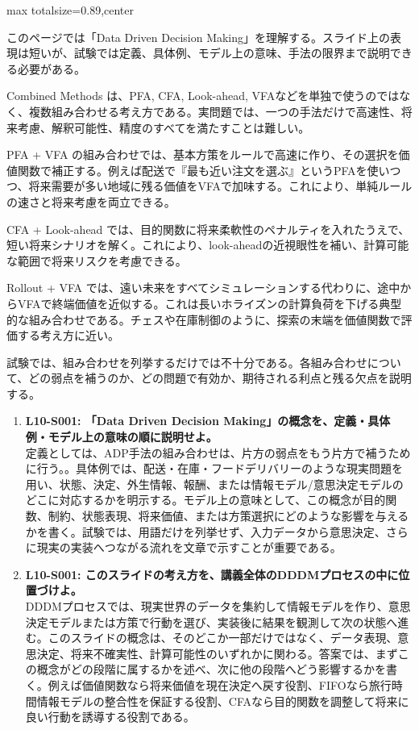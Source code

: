 \begin{minipage}[t]{0.58\textwidth}
\begin{adjustbox}{max totalsize={\textwidth}{0.89\textheight},center}
\begin{minipage}{\textwidth}\scriptsize
{}このページでは「Data Driven Decision Making」を理解する。スライド上の表現は短いが、試験では定義、具体例、モデル上の意味、手法の限界まで説明できる必要がある。\par
Combined Methods は、PFA, CFA, Look-ahead, VFAなどを単独で使うのではなく、複数組み合わせる考え方である。実問題では、一つの手法だけで高速性、将来考慮、解釈可能性、精度のすべてを満たすことは難しい。\par
PFA + VFA の組み合わせでは、基本方策をルールで高速に作り、その選択を価値関数で補正する。例えば配送で『最も近い注文を選ぶ』というPFAを使いつつ、将来需要が多い地域に残る価値をVFAで加味する。これにより、単純ルールの速さと将来考慮を両立できる。\par
CFA + Look-ahead では、目的関数に将来柔軟性のペナルティを入れたうえで、短い将来シナリオを解く。これにより、look-aheadの近視眼性を補い、計算可能な範囲で将来リスクを考慮できる。\par
Rollout + VFA では、遠い未来をすべてシミュレーションする代わりに、途中からVFAで終端価値を近似する。これは長いホライズンの計算負荷を下げる典型的な組み合わせである。チェスや在庫制御のように、探索の末端を価値関数で評価する考え方に近い。\par
試験では、組み合わせを列挙するだけでは不十分である。各組み合わせについて、どの弱点を補うのか、どの問題で有効か、期待される利点と残る欠点を説明する。\par{}\begin{enumerate}\item \textbf{L10-S001: 「Data Driven Decision Making」の概念を、定義・具体例・モデル上の意味の順に説明せよ。}\\定義としては、ADP手法の組み合わせは、片方の弱点をもう片方で補うために行う。。具体例では、配送・在庫・フードデリバリーのような現実問題を用い、状態、決定、外生情報、報酬、または情報モデル/意思決定モデルのどこに対応するかを明示する。モデル上の意味として、この概念が目的関数、制約、状態表現、将来価値、または方策選択にどのような影響を与えるかを書く。試験では、用語だけを列挙せず、入力データから意思決定、さらに現実の実装へつながる流れを文章で示すことが重要である。\item \textbf{L10-S001: このスライドの考え方を、講義全体のDDDMプロセスの中に位置づけよ。}\\DDDMプロセスでは、現実世界のデータを集約して情報モデルを作り、意思決定モデルまたは方策で行動を選び、実装後に結果を観測して次の状態へ進む。このスライドの概念は、そのどこか一部だけではなく、データ表現、意思決定、将来不確実性、計算可能性のいずれかに関わる。答案では、まずこの概念がどの段階に属するかを述べ、次に他の段階へどう影響するかを書く。例えば価値関数なら将来価値を現在決定へ戻す役割、FIFOなら旅行時間情報モデルの整合性を保証する役割、CFAなら目的関数を調整して将来に良い行動を誘導する役割である。\end{enumerate}
\end{minipage}
\end{adjustbox}
\end{minipage}


